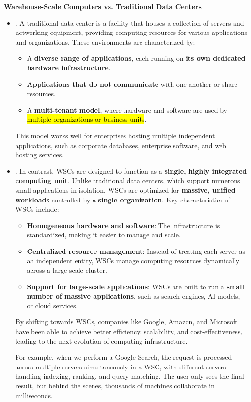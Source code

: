 \highspace
\begin{flushleft}
    \textcolor{Green3}{ \textbf{Warehouse-Scale Computers vs. Traditional Data Centers}}
\end{flushleft}
\begin{itemize}
    \item {}. A traditional data center is a facility that houses a collection of servers and networking equipment, providing computing resources for various applications and organizations. These environments are characterized by:
    \begin{itemize}
        \item A \textbf{diverse range of applications}, each running on \textbf{its own dedicated hardware infrastructure}.
        \item \textbf{Applications that do not communicate} with one another or share resources.
        \item A \textbf{multi-tenant model}, where hardware and software are used by \hl{multiple organizations or business units}.  
    \end{itemize}
    This model works well for enterprises hosting multiple independent applications, such as corporate databases, enterprise software, and web hosting services.

    \item {}. In contrast, WSCs are designed to function as a \textbf{single, highly integrated computing unit}. Unlike traditional data centers, which support numerous small applications in isolation, WSCs are optimized for \textbf{massive, unified workloads} controlled by a \textbf{single organization}. Key characteristics of WSCs include:
    \begin{itemize}
        \item \textbf{Homogeneous hardware and software}: The infrastructure is standardized, making it easier to manage and scale.
        \item \textbf{Centralized resource management}: Instead of treating each server as an independent entity, WSCs manage computing resources dynamically across a large-scale cluster.
        \item \textbf{Support for large-scale applications}: WSCs are built to run a \textbf{small number of massive applications}, such as search engines, AI models, or cloud services.
    \end{itemize}
    By shifting towards WSCs, companies like Google, Amazon, and Microsoft have been able to achieve better efficiency, scalability, and cost-effectiveness, leading to the next evolution of computing infrastructure.
    
    For example, when we perform a Google Search, the request is processed across multiple servers simultaneously in a WSC, with different servers handling indexing, ranking, and query matching. The user only sees the final result, but behind the scenes, thousands of machines collaborate in milliseconds.
\end{itemize}

